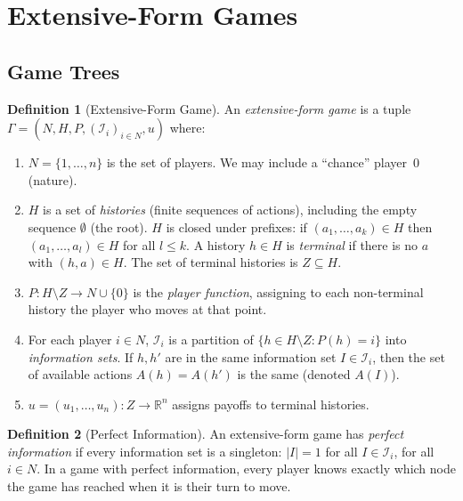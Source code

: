 \documentclass[11pt,a4paper]{article}
\theoremstyle{definition}
\newtheorem{definition}{Definition}[section]
\theoremstyle{plain}
\theoremstyle{remark}
\newcommand{\R}{\mathbb{R}}
\begin{document}
\section{Extensive-Form Games}
\label{sec:extensive}

\subsection{Game Trees}
\label{subsec:game_trees}

\begin{definition}[Extensive-Form Game]
\label{def:extensive}
An \emph{extensive-form game} is a tuple
$\Gamma = (N, H, P, (\mathcal{I}_i)_{i \in N}, u)$ where:
\begin{enumerate}[nosep,label=(\roman*)]
    \item $N = \{1, \ldots, n\}$ is the set of players. We may include a ``chance''
    player~0 (nature).
    \item $H$ is a set of \emph{histories} (finite sequences of actions), including the
    empty sequence $\emptyset$ (the root). $H$ is closed under prefixes: if
    $(a_1, \ldots, a_k) \in H$ then $(a_1, \ldots, a_l) \in H$ for all $l \leq k$.
    A history $h \in H$ is \emph{terminal} if there is no $a$ with $(h, a) \in H$.
    The set of terminal histories is $Z \subseteq H$.
    \item $P : H \setminus Z \to N \cup \{0\}$ is the \emph{player function}, assigning
    to each non-terminal history the player who moves at that point.
    \item For each player $i \in N$, $\mathcal{I}_i$ is a partition of
    $\{h \in H \setminus Z : P(h) = i\}$ into \emph{information sets}. If
    $h, h'$ are in the same information set $I \in \mathcal{I}_i$, then the
    set of available actions $A(h) = A(h')$ is the same (denoted $A(I)$).
    \item $u = (u_1, \ldots, u_n) : Z \to \R^n$ assigns payoffs to terminal histories.
\end{enumerate}
\end{definition}

\begin{definition}[Perfect Information]
\label{def:perfect_info}
An extensive-form game has \emph{perfect information} if every information set is a
singleton: $|I| = 1$ for all $I \in \mathcal{I}_i$, for all $i \in N$. In a game
with perfect information, every player knows exactly which node the game has reached
when it is their turn to move.
\end{definition}
\end{document}
